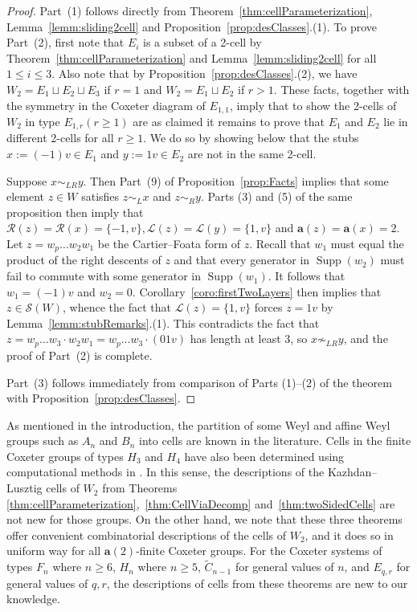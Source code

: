 \documentclass[ALCO,Unicode,published]{cedram}
\newcommand{\call}{\mathcal{L}}
\newcommand{\calr}{\mathcal{R}}
\newcommand{\la}{\mathbf{a}}
\newcommand{\sw}{\mathcal{S}(W)}
\DeclareMathOperator{\supp}{\mathrm{Supp}}
\begin{document}
\begin{proof}
Part~(1) follows directly from Theorem~\ref{thm:cellParameterization}, Lemma~\ref{lemm:sliding2cell} and
Proposition~\ref{prop:desClasses}.(1). To prove Part~(2), first note that $E_i$ is a subset of a 2-cell
by Theorem~\ref{thm:cellParameterization} and Lemma~\ref{lemm:sliding2cell} for all $1\le i\le 3$. Also
note that by Proposition~\ref{prop:desClasses}.(2), we have  $W_2=E_1\sqcup E_2\sqcup E_3$ if $r=1$ and
$W_2=E_1\sqcup E_2$ if $r>1$.  These facts, together with the symmetry in the Coxeter diagram
of $E_{1,1}$, imply that to show the 2-cells of $W_2$ in type $E_{1,r} (r\ge 1)$ are as
claimed it remains to prove that $E_1$ and $E_2$ lie in different 2-cells for all $r\ge 1$.
We do so by showing below that the stubs $x:=(-1)v\in E_1$ and $y:=1v\in E_2$ are not in the
same 2-cell.

Suppose $x\sim_{LR} y$. Then Part~(9) of Proposition~\ref{prop:Facts} implies that some element $z\in W$
satisfies $z\sim_L x$ and $z\sim_R y$. Parts (3) and (5) of the same proposition then imply that
$\calr(z)=\calr(x)=\{-1,v\}, \call(z)=\call(y)=\{1,v\}$ and $\la(z)=\la(x)=2$. Let $z=w_p\dots
w_2w_1$ be the Cartier--Foata form of $z$. Recall that $w_1$ must equal the product of the right
descents of $z$ and that every generator in $\supp(w_2)$ must fail to commute with some
generator in $\supp(w_1)$. It follows that $w_1=(-1)v$ and $w_2=0$. Corollary~\ref{coro:firstTwoLayers}
then implies that $z\in \sw$, whence the fact that $\call(z)=\{1,v\}$ forces $z=1v$ by
Lemma~\ref{lemm:stubRemarks}.(1).  This contradicts the fact that $z=w_p\dots w_3\cdot
w_2w_1=w_p\dots w_3\cdot (01v)$ has length at least 3, so $x\not\sim_{LR} y$, and the proof of
Part~(2) is complete. 

Part~(3) follows immediately from comparison of Parts (1)--(2) of the theorem with
Proposition~\ref{prop:desClasses}.
\end{proof}
   
As mentioned in the introduction, the partition of some Weyl and affine Weyl groups such as $A_n$
and $B_n$ into cells are known in the literature. Cells in the finite Coxeter groups of types $H_3$
and $H_4$ have also been determined using computational methods in \cite{AlvisH4}. In this sense,
the descriptions of the Kazhdan--Lusztig cells of $W_2$ from Theorems
\ref{thm:cellParameterization},~\ref{thm:CellViaDecomp} and~\ref{thm:twoSidedCells} are not new for
those groups.  On the other hand, we note that these three theorems offer convenient combinatorial
descriptions of the cells of $W_2$, and it does so in uniform way for all $\la(2)$-finite Coxeter
groups. For the Coxeter systems of types $F_n$ where $n\ge 6$, $H_n$ where $n\ge 5$, $\tilde
C_{n-1}$ for general values of $n$, and $E_{q,r}$ for general values of $q,r$, the descriptions of
cells from these theorems are new to our knowledge.
\end{document}
